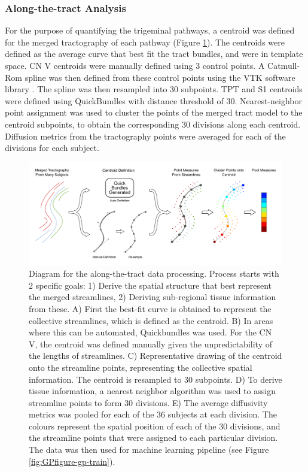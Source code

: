 \subsubsection{Along-the-tract Analysis}
For the purpose of quantifying the trigeminal pathways, a centroid was defined for the merged tractography of each pathway (Figure \ref{fig:GPfigure-method-centroid}). The centroids were defined as the average curve that best fit the tract bundles, and were in template space. CN V centroids were manually defined using 3 control points. A Catmull-Rom spline \cite{DeRose1988} was then defined from these control points using the VTK software library \cite{Schroeder2005}. The spline was then resampled into 30 subpoints. TPT and S1 centroids were defined using QuickBundles \cite{Garyfallidis2012} with distance threshold of 30. Nearest-neighbor point assignment was used to cluster the points of the merged tract model to the centroid subpoints, to obtain the corresponding 30 divisions along each centroid. Diffusion metrics from the tractography points were averaged for each of the divisions for each subject. 

\begin{figure}[ht]
\centering
\includegraphics[width=\linewidth]{thesis/images/tn-gp-sagit/figure-path-analysis.pdf}
\caption{Diagram for the along-the-tract data processing.
Process starts with 2 specific goals: 1) Derive the spatial structure that best represent the merged streamlines, 2) Deriving sub-regional tissue information from these. A) First the best-fit curve is obtained to represent the collective streamlines, which is defined as the centroid. B) In areas where this can be automated, Quickbundles was used. For the CN V, the centroid was defined manually given the unpredictability of the lengths of streamlines. C) Representative drawing of the centroid onto the streamline points, representing the collective spatial information. The centroid is resampled to 30 subpoints. D) To derive tissue information, a nearest neighbor algorithm was used to assign streamline points to form 30 divisions. E) The average diffusivity metrics was pooled for each of the 36 subjects at each division. The colours represent the spatial position of each of the 30 divisions, and the streamline points that were assigned to each particular division. The data was then used for machine learning pipeline (see Figure \ref{fig:GPfigure-gp-train}).
}
\label{fig:GPfigure-method-centroid}
\end{figure}

